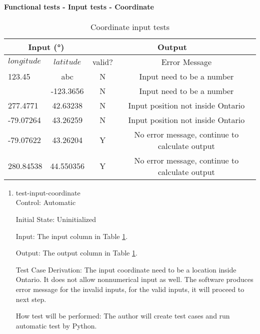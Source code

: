 \documentclass[12pt, titlepage]{article}
\begin{document}
		
\paragraph{Functional tests - Input tests - Coordinate}

\begin{center}
\begin{table}[h]
\resizebox{\textwidth}{!}
{ %
    \begin{tabular}{ lc|cc }
    \hline
      \multicolumn{2}{c|}{Input (\si[per-mode=symbol] {\degree}) }                            & \multicolumn{2}{c}{Output} \\ 
    
    \hline
        $longitude$   &   $latitude$     &   valid?   &   Error Message \\ \hline
    	   123.45 & abc & N & Input need to be a number \\ \hline
        & -123.3656 & N & Input need to be a number \\ \hline
       277.4771  & 42.63238 &  N  & Input position not inside Ontario                         \\  \hline
       -79.07264  & 43.26259 &  N  & Input position not inside Ontario                         \\  \hline
       -79.07622  & 43.26204 &  Y  & No error message, continue to calculate output          \\  \hline
       280.84538  & 44.550356 &  Y  &  No error message, continue to calculate output         \\  \hline
    
    \end{tabular} %
}
\caption{Coordinate input tests}
\label{Table:coordinate_test}
\end{table}
\end{center}

\begin{enumerate}

\item{test-input-coordinate\\}
Control: Automatic
					
Initial State: Uninitialized
					
Input: The input column in Table \ref{Table:coordinate_test}.
					
Output: The output column in Table \ref{Table:coordinate_test}. 

Test Case Derivation: The input coordinate need to be a location inside Ontario. It does not allow nonnumerical input as well. The software produces error message for the invalid inputs, for the valid inputs, it will proceed to next step. %
					
How test will be performed: The author will create test cases and run automatic test by Python.
\end{enumerate}
\end{document}
